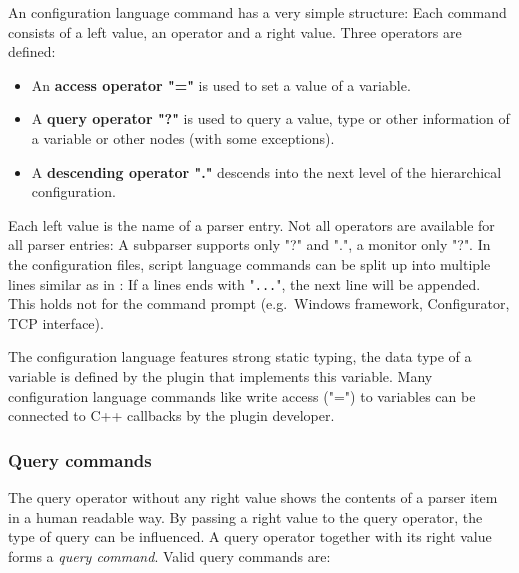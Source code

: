 An \mha{} configuration language command has a very simple structure: Each
command consists of a left value, an operator and a
right value. Three operators are defined:

%
%
%
\begin{itemize}
\item An {\bf access operator "="} is used to set a value of a variable.
\item A {\bf query operator "?"}
  is used to query a value, type or other information of a variable or other
  nodes (with some exceptions).
\item A {\bf descending operator "."} descends into the next level of the
  hierarchical \mha{} configuration.
\end{itemize}

Each left value is the name of a parser entry. Not all operators are
available for all parser entries: A subparser supports only "?" and
".", a monitor only "?". In the configuration files, \mha{} script
language commands can be split up into multiple lines similar as in
\Matlab{}: If a lines ends with "\verb!...!", the next line will be
appended. This holds not for the command prompt (e.g.\ Windows
framework, Configurator, TCP interface).

The \mha{} configuration language features strong static typing, the data type
of a variable is defined by the plugin that implements this variable.
Many configuration language commands like write access ("=") to variables can
be connected to C++ callbacks by the plugin developer.

\subsubsection{Query commands}

%
The query operator without any right value shows the contents of a parser item
in a human readable way. By passing a right value to the query operator, the
type of query can be influenced. A query operator together with its right
value forms a {\em query command}. Valid query commands
are:
%
%
%
%
%
%
%
%

